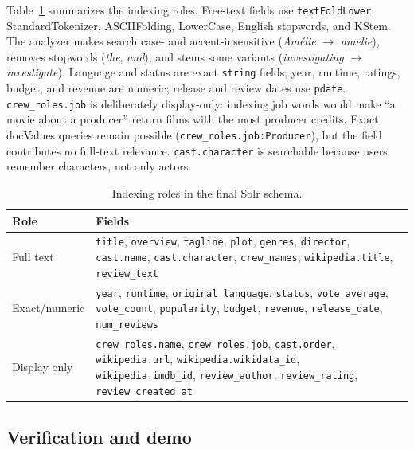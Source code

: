 Table~\ref{tab:index-fields} summarizes the indexing roles. Free-text fields use
\texttt{textFoldLower}: StandardTokenizer, ASCIIFolding, LowerCase, English
stopwords, and KStem. The analyzer makes search case- and accent-insensitive
(\textit{Amélie} $\rightarrow$ \textit{amelie}), removes stopwords
(\textit{the}, \textit{and}), and stems some variants
(\textit{investigating} $\rightarrow$ \textit{investigate}). Language and status
are exact \texttt{string} fields; year, runtime, ratings, budget, and revenue are
numeric; release and review dates use \texttt{pdate}. \texttt{crew\_roles.job} is
deliberately display-only: indexing job words would make ``a movie about a
producer'' return films with the most producer credits. Exact docValues queries
remain possible (\texttt{crew\_roles.job:Producer}), but the field contributes no
full-text relevance. \texttt{cast.character} is searchable because users remember
characters, not only actors.


\begin{table}[t]
\centering
\setlength{\tabcolsep}{4pt}
\caption{Indexing roles in the final Solr schema.}
\label{tab:index-fields}
\footnotesize
\begin{tabular}{p{1.9cm}p{5.0cm}}
\hline
Role & Fields \\
\hline
Full text & \texttt{title}, \texttt{overview}, \texttt{tagline}, \texttt{plot},
\texttt{genres}, \texttt{director}, \texttt{cast.name},
\texttt{cast.character}, \texttt{crew\_names}, \texttt{wikipedia.title},
\texttt{review\_text} \\
Exact/numeric & \texttt{year}, \texttt{runtime},
\texttt{original\_language}, \texttt{status}, \texttt{vote\_average},
\texttt{vote\_count}, \texttt{popularity}, \texttt{budget}, \texttt{revenue},
\texttt{release\_date}, \texttt{num\_reviews} \\
Display only & \texttt{crew\_roles.name}, \texttt{crew\_roles.job},
\texttt{cast.order}, \texttt{wikipedia.url}, \texttt{wikipedia.wikidata\_id},
\texttt{wikipedia.imdb\_id}, \texttt{review\_author}, \texttt{review\_rating},
\texttt{review\_created\_at} \\
\hline
\end{tabular}
\end{table}

\subsection{Verification and demo}
\label{sec:verification-demo}

